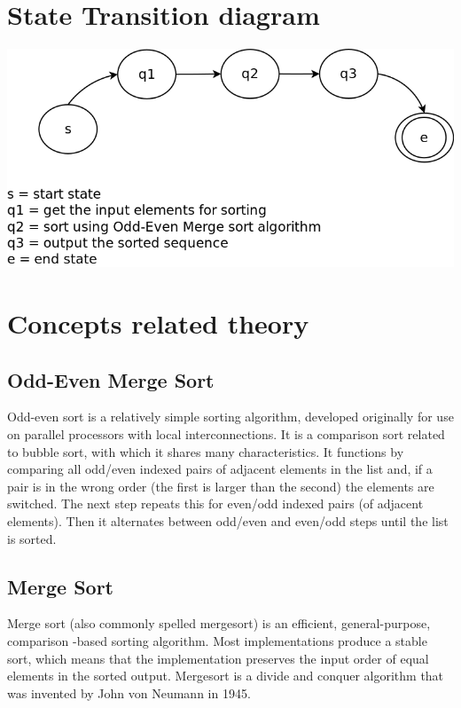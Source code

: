 \documentclass[10pt,a4paper]{article}
\begin{document}
\section{State Transition diagram}
\includegraphics[scale=0.5]{stdg.png}

\section{Concepts related theory}
\subsection{Odd-Even Merge Sort} 
	Odd-even sort is a relatively simple sorting algorithm, developed originally for use on parallel processors with local interconnections. It is a comparison sort related to bubble sort, with which it shares many characteristics. It functions by comparing all odd/even indexed pairs of adjacent elements in the list and, if a pair is in the wrong order (the first is larger than the second) the elements are switched. The next step repeats this for even/odd indexed pairs (of adjacent elements). Then it alternates between odd/even and even/odd steps until the list is sorted.
	
	\subsection{Merge Sort}
	Merge sort (also commonly spelled mergesort) is an efficient, general-purpose, comparison -based sorting algorithm. Most implementations produce a stable sort, which means that the implementation preserves the input order of equal elements in the sorted output. Mergesort is a divide and conquer algorithm that was invented by John von Neumann in 1945.  
	
\end{document}
